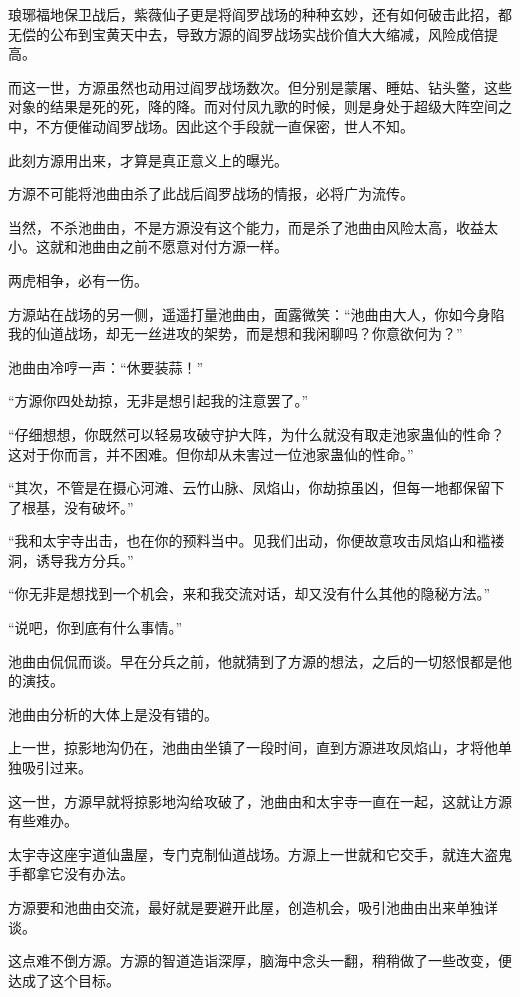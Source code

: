 \begin{this_body}
琅琊福地保卫战后，紫薇仙子更是将阎罗战场的种种玄妙，还有如何破击此招，都无偿的公布到宝黄天中去，导致方源的阎罗战场实战价值大大缩减，风险成倍提高。

而这一世，方源虽然也动用过阎罗战场数次。但分别是蒙屠、睡姑、钻头鳖，这些对象的结果是死的死，降的降。而对付凤九歌的时候，则是身处于超级大阵空间之中，不方便催动阎罗战场。因此这个手段就一直保密，世人不知。

此刻方源用出来，才算是真正意义上的曝光。

方源不可能将池曲由杀了此战后阎罗战场的情报，必将广为流传。

当然，不杀池曲由，不是方源没有这个能力，而是杀了池曲由风险太高，收益太小。这就和池曲由之前不愿意对付方源一样。

两虎相争，必有一伤。

方源站在战场的另一侧，遥遥打量池曲由，面露微笑：“池曲由大人，你如今身陷我的仙道战场，却无一丝进攻的架势，而是想和我闲聊吗？你意欲何为？”

池曲由冷哼一声：“休要装蒜！”

“方源你四处劫掠，无非是想引起我的注意罢了。”

“仔细想想，你既然可以轻易攻破守护大阵，为什么就没有取走池家蛊仙的性命？这对于你而言，并不困难。但你却从未害过一位池家蛊仙的性命。”

“其次，不管是在摄心河滩、云竹山脉、凤焰山，你劫掠虽凶，但每一地都保留下了根基，没有破坏。”

“我和太宇寺出击，也在你的预料当中。见我们出动，你便故意攻击凤焰山和褴褛洞，诱导我方分兵。”

“你无非是想找到一个机会，来和我交流对话，却又没有什么其他的隐秘方法。”

“说吧，你到底有什么事情。”

池曲由侃侃而谈。早在分兵之前，他就猜到了方源的想法，之后的一切怒恨都是他的演技。

池曲由分析的大体上是没有错的。

上一世，掠影地沟仍在，池曲由坐镇了一段时间，直到方源进攻凤焰山，才将他单独吸引过来。

这一世，方源早就将掠影地沟给攻破了，池曲由和太宇寺一直在一起，这就让方源有些难办。

太宇寺这座宇道仙蛊屋，专门克制仙道战场。方源上一世就和它交手，就连大盗鬼手都拿它没有办法。

方源要和池曲由交流，最好就是要避开此屋，创造机会，吸引池曲由出来单独详谈。

这点难不倒方源。方源的智道造诣深厚，脑海中念头一翻，稍稍做了一些改变，便达成了这个目标。


\end{this_body}
